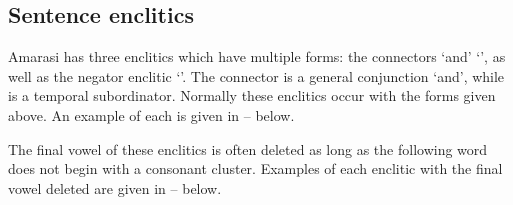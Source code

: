 \subsection{Sentence enclitics}\label{sec:SenEnc}
Amarasi has three enclitics which have multiple forms:
the connectors  `and'  `{\te}', as well as the negator enclitic  `{\fa}'.
The connector  is a general conjunction `and',
while  is a temporal subordinator.
Normally these enclitics occur with the forms given above.
An example of each is given in
-- below.

\begin{exe}
	\label{ex:130920-1, 0.51 ch:ph}
	\label{ex:130920-1, 2.18 ch:ph}
		\label{ex:130825-6, 17.02 ch:DetPhoPho}
\end{exe}

The final vowel of these enclitics is often deleted
as long as the following word does not begin with a consonant cluster.
Examples of each enclitic with the final vowel deleted
are given in -- below.

